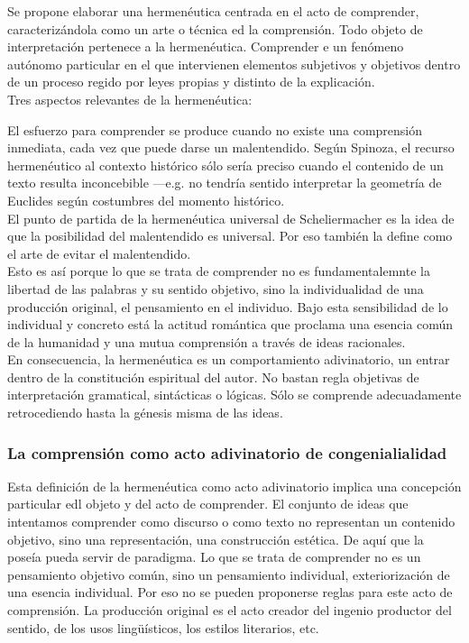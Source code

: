 \documentclass[a4paper, 11pt, twocolumn, spanish]{article}
\begin{document}
Se propone elaborar una hermenéutica centrada en el acto de
comprender, caracterizándola como un arte o técnica ed la
comprensión. Todo objeto de interpretación pertenece a la
hermenéutica. Comprender e un fenómeno autónomo particular en el que
intervienen elementos subjetivos y objetivos dentro de un proceso
regido por leyes propias y distinto de la explicación.\\[0pt]
Tres aspectos relevantes de la hermenéutica:

El esfuerzo para comprender se produce cuando no existe una
comprensión inmediata, cada vez que puede darse un malentendido. Según
Spinoza, el recurso hermenéutico al contexto histórico sólo sería
preciso cuando el contenido de un texto resulta inconcebible —e.g. no
tendría sentido interpretar la geometría de Euclides según costumbres
del momento histórico.\\[0pt]
El punto de partida de la hermenéutica universal de Scheliermacher es
la idea de que la posibilidad del malentendido es universal. Por eso
también la define como el arte de evitar el malentendido.\\[0pt]

Esto es así porque lo que se trata de comprender no es
fundamentalemnte la libertad de las palabras y su sentido objetivo,
sino la individualidad de una producción original, el pensamiento en el
individuo. Bajo esta sensibilidad de lo individual y concreto está la
actitud romántica que proclama una esencia común de la humanidad y una
mutua comprensión a través de ideas racionales.\\[0pt]

En consecuencia, la hermenéutica es un comportamiento adivinatorio, un
entrar dentro de la constitución espiritual del autor. No bastan regla
objetivas de interpretación gramatical, sintácticas o lógicas. Sólo se
comprende adecuadamente retrocediendo hasta la génesis misma de las
ideas.

\subsubsection{La comprensión como acto adivinatorio de congenialialidad}
\label{sec:orgc0afcca}

Esta definición de la hermenéutica como acto adivinatorio implica una
concepción particular edl objeto y del acto de comprender. El conjunto
de ideas que intentamos comprender como discurso o como texto no
representan un contenido objetivo, sino una representación, una
construcción estética. De aquí que la poseía pueda servir de
paradigma. Lo que se trata de comprender no es un pensamiento objetivo
común, sino un pensamiento individual, exteriorización de una esencia
individual. Por eso no se pueden proponerse reglas para este acto de
comprensión. La producción original es el acto creador del ingenio
productor del sentido, de los usos lingüísticos, los estilos
literarios, etc.\\[0pt]
\end{document}
